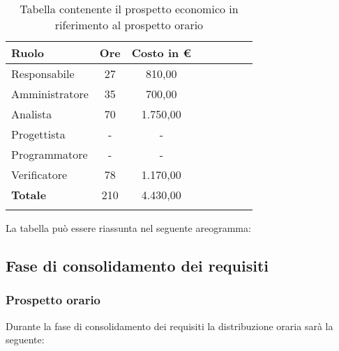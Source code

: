 			\begin{longtable}{|l|c|c|c|c|c|c|c|}
				\hline
				\rowcolor{lighter-grayer}
				\textbf{Ruolo} & \textbf{Ore} & \textbf{Costo in €} \\
				\hline
				\endfirsthead
				
				\hline
				Responsabile & 27 & 810,00\\
				\hline
				\hline
				Amministratore & 35 & 700,00\\
				\hline
				\hline
				Analista & 70 & 1.750,00\\
				\hline
				\hline
				Progettista & - & -\\
				\hline
				\hline
				Programmatore & - & -\\
				\hline
				\hline
				Verificatore & 78 & 1.170,00\\
				\hline
				\textbf{Totale} & 210 & 4.430,00\\
				\hline
				\caption{Tabella contenente il prospetto economico in riferimento al prospetto orario}
			\end{longtable}
			\pagebreak
		
			La tabella può essere riassunta nel seguente areogramma:

            \subsection{Fase di consolidamento dei requisiti}
            \subsubsection{Prospetto orario}
			Durante la fase di consolidamento dei requisiti la distribuzione oraria sarà la seguente:
			

